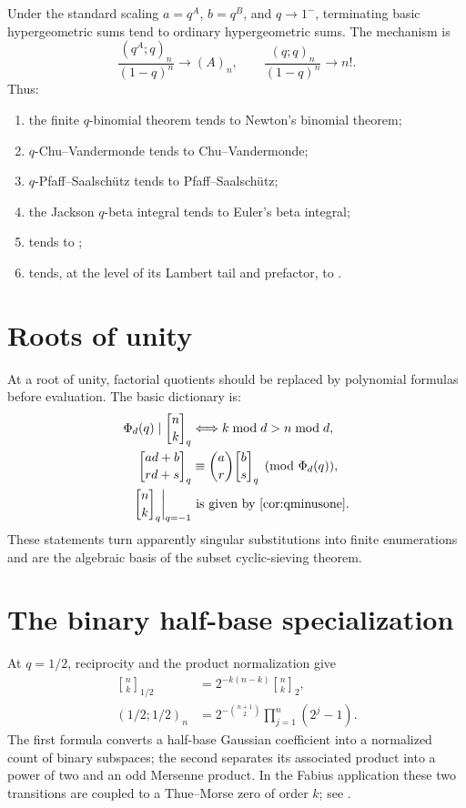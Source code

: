 \documentclass[11pt,oneside,openany]{book}
\theoremstyle{definition}
\theoremstyle{remark}
\newcommand{\qbinom}[2]{\genfrac{[}{]}{0pt}{}{#1}{#2}_{q}}
\newcommand{\Qbinom}[3]{\genfrac{[}{]}{0pt}{}{#1}{#2}_{#3}}
\begin{document}
Under the standard scaling $a=q^A$, $b=q^B$, and $q\to1^-$, terminating basic hypergeometric sums tend to ordinary hypergeometric sums.  The mechanism is
\[
 \frac{(q^A;q)_n}{(1-q)^n}\longrightarrow(A)_n,
 \qquad
 \frac{(q;q)_n}{(1-q)^n}\longrightarrow n!.
\]
Thus:
\begin{enumerate}
\item the finite $q$-binomial theorem tends to Newton's binomial theorem;
\item $q$-Chu--Vandermonde tends to Chu--Vandermonde;
\item $q$-Pfaff--Saalsch\"utz tends to Pfaff--Saalsch\"utz;
\item the Jackson $q$-beta integral tends to Euler's beta integral;
\item {} tends to ;
\item {} tends, at the level of its Lambert tail and prefactor, to .
\end{enumerate}

\section{Roots of unity}

At a root of unity, factorial quotients should be replaced by polynomial formulas before evaluation.  The basic dictionary is:
\begin{align*}
 \Phi_d(q)\mid\qbinom nk
 &\Longleftrightarrow k\bmod d>n\bmod d,\\
 \Qbinom{ad+b}{rd+s}q
 &\equiv\binom ar\Qbinom bsq\pmod{\Phi_d(q)},\\
 \qbinom nk\bigg|_{q=-1}
 &\text{ is given by \Cref{cor:qminusone}.}
\end{align*}
These statements turn apparently singular substitutions into finite enumerations and are the algebraic basis of the subset cyclic-sieving theorem.

\section{The binary half-base specialization}
At $q=1/2$, reciprocity and the product normalization give
\begin{align*}
 \Qbinom nk{1/2}&=2^{-k(n-k)}\Qbinom nk2,\\
 (1/2;1/2)_n&=2^{-\binom{n+1}{2}}\prod_{j=1}^n(2^j-1).
\end{align*}
The first formula converts a half-base Gaussian coefficient into a normalized count of binary subspaces; the second separates its associated product into a power of two and an odd Mersenne product.  In the Fabius application these two transitions are coupled to a Thue--Morse zero of order $k$; see .
\end{document}
